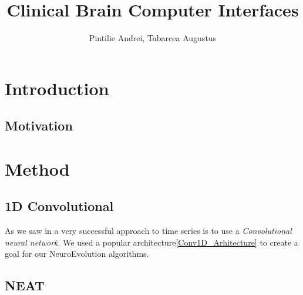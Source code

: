 \documentclass{article}
\author{Pintilie Andrei, Tabarcea Augustus}
\title{Clinical Brain Computer Interfaces}
\begin{document}
\maketitle

\section{Introduction}
\subsection{Motivation}

\section{Method}

\subsection{1D Convolutional}

As we saw in\cite{Deep_series} a very successful approach to time series is to use a \textit{Convolutional neural network}\cite{Convolutional_neural_network}.
We used a popular architecture\autoref{Conv1D_Arhitecture} to create a goal for our NeuroEvolution algorithms.

\subsection{NEAT}
\end{document}

